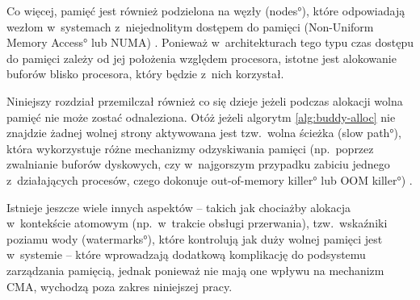 Co więcej, pamięć jest również podzielona na węzły (\ang{nodes}),
które odpowiadają wezłom w~systemach z~niejednolitym dostępem do
pamięci (\ang{Non-Uniform Memory Access} lub NUMA)
\autocite[podrozdział 8.1.2]{bib:utlk}.  Ponieważ w~architekturach
tego typu czas dostępu do pamięci zależy od jej położenia względem
procesora, istotne jest alokowanie buforów blisko procesora, który
będzie z~nich korzystał.

Niniejszy rozdział przemilczał również co się dzieje jeżeli podczas
alokacji wolna pamięć nie może zostać odnaleziona.  Otóż jeżeli
algorytm \ref{alg:buddy-alloc} nie znajdzie żadnej wolnej strony
aktywowana jest tzw.\ wolna ścieżka (\ang{slow path}), która
wykorzystuje różne mechanizmy odzyskiwania pamięci (np.\ poprzez
zwalnianie buforów dyskowych, czy w~najgorszym przypadku zabiciu
jednego z~działających procesów, czego dokonuje \ang*{out-of-memory
  killer} lub OOM \ang*{killer}) \autocite[rozdział 17]{bib:utlk}.

Istnieje jeszcze wiele innych aspektów -- takich jak chociażby
alokacja w~kontekście atomowym (np.\ w~trakcie obsługi przerwania),
tzw.\ wskaźniki poziamu wody (\ang{watermarks}), które kontrolują jak
duży wolnej pamięci jest w~systemie -- które wprowadzają dodatkową
komplikację do podsystemu zarządzania pamięcią, jednak ponieważ nie
mają one wpływu na mechanizm CMA, wychodzą poza zakres niniejszej
pracy.
